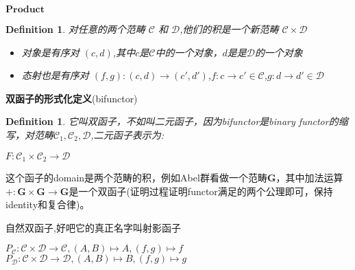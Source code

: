 \documentclass{article}
\newtheorem{definition}[theorem]{Definition}
\begin{document}
\begin{flushleft}
$\textbf{Product}$ \\
\begin{definition}
对任意的两个范畴 $\mathcal{C}$ 和 $\mathcal{D}$,他们的积是一个新范畴 $\mathcal{C} \times \mathcal{D}$\\
\begin{itemize}
	\item 对象是有序对 $\left( c,d \right)$,其中$c$是$\mathcal{C}$中的一个对象，$d$是是$\mathcal{D}$的一个对象 
	\item 态射也是有序对 $\left(f,g \right) \colon \left(c,d\right) \rightarrow \left(c',d'\right)$,$f\colon c \rightarrow c' \in \mathcal{C}$,$g \colon d \rightarrow d' \in \mathcal{D}$
\end{itemize}
\end{definition}
\end{flushleft}


\begin{flushleft}
\textbf{双函子的形式化定义}(bifunctor) \\ 
\begin{definition}
它叫双函子，不如叫二元函子，因为bifunctor是binary functor的缩写，对范畴$\mathcal{C}_1,\mathcal{C}_2,\mathcal{D}$,二元函子表示为:\\

\begin{center}
$F \colon \mathcal{C}_1 \times \mathcal{C}_2 \rightarrow \mathcal{D}$
\end{center}
\end{definition}

这个函子的domain是两个范畴的积，例如Abel群看做一个范畴$\mathbf{G}$，其中加法运算 $+ \colon \mathbf{G} \times \mathbf{G} \rightarrow \mathbf{G}$是一个双函子(证明过程证明functor满足的两个公理即可，保持identity和复合律)。 

\end{flushleft}

\pagebreak
\begin{flushleft}
$\textbf{自然双函子}$,好吧它的真正名字叫$\textbf{射影函子}$ \\
\begin{center}
$P_{\mathcal{C}} \colon \mathcal{C} \times \mathcal{D} \rightarrow \mathcal{C},\left( A,B \right)\mapsto A,\left( f,g \right)\mapsto f$ \\ \vbox{}
$P_{\mathcal{D}} \colon \mathcal{C} \times \mathcal{D} \rightarrow \mathcal{D},\left( A,B \right)\mapsto B,\left( f,g \right)\mapsto g$ \\
\end{center} 
\end{flushleft}
\end{document}
